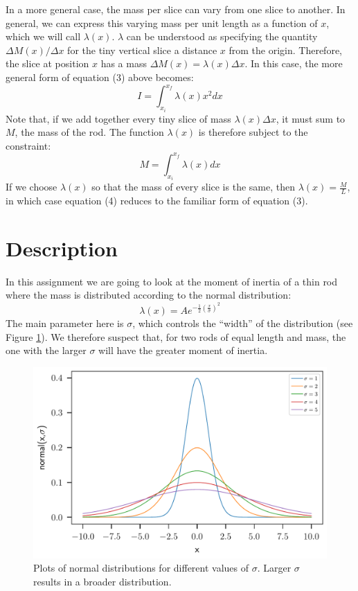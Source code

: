 \documentclass{article}
\begin{document}
In a more general case, the mass per slice can vary from one slice to another. In general, we can express this varying mass per unit length as a function of $x$, which we will call $\lambda(x)$. $\lambda$ can be understood as specifying the quantity $\Delta M(x)/\Delta x$ for the tiny vertical slice a distance $x$ from the origin. Therefore, the slice at position $x$ has a mass $\Delta M(x)=\lambda(x)\Delta x$. In this case, the more general form of equation (3) above becomes:
\begin{equation}
	I=\int_{x_i}^{x_f}\lambda(x)x^2dx
\end{equation}
Note that, if we add together every tiny slice of mass $\lambda(x)\Delta x$, it must sum to $M$, the mass of the rod. The function $\lambda(x)$ is therefore subject to the constraint:
\begin{equation}
	M=\int_{x_i}^{x_f}\lambda(x)dx
\end{equation}
If we choose $\lambda(x)$ so that the mass of every slice is the same, then $\lambda(x)=\frac{M}{L}$, in which case equation (4) reduces to the familiar form of equation (3).
\section*{Description}
In this assignment we are going to look at the moment of inertia of a thin rod where the mass is distributed according to the normal distribution:
\begin{equation}
	\lambda(x) = Ae^{-\frac{1}{2}\left(\frac{x}{\sigma}\right)^2}
\end{equation}
The main parameter here is $\sigma$, which controls the ``width'' of the distribution (see Figure \ref{fig}). We therefore suspect that, for two rods of equal length and mass, the one with the larger $\sigma$ will have the greater moment of inertia.
\begin{figure}
	\centering
	\includegraphics[width=15cm]{normal_dist}
	\caption{Plots of normal distributions for different values of $\sigma$. Larger $\sigma$ results in a broader distribution.}
	\label{fig}
\end{figure}
\end{document}

